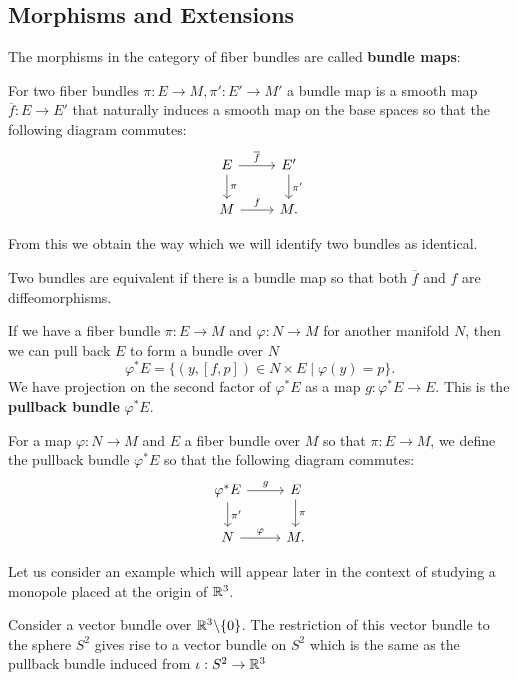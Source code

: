 		\subsection{Morphisms and Extensions}
		The morphisms in the category of fiber bundles are called \textbf{bundle maps}:
		
		\begin{defn}
			For two fiber bundles $\pi: E \rightarrow M, \pi': E' \rightarrow M'$ a bundle map is a smooth map $\overline f: E \rightarrow E'$ that naturally induces a smooth map on the base spaces so that the following diagram commutes:
			\[
			\begin{tikzcd}
			E \arrow{r}{\overline f} \arrow{d}{\pi} & E' \arrow{d}{\pi'} \\
			M \arrow{r}{f} & M.
			\end{tikzcd}
			\]
		\end{defn}
		From this we obtain the way which we will identify two bundles as identical.
		\begin{defn}
			Two bundles are equivalent if there is a bundle map so that both $\overline f$ and $f$ are diffeomorphisms. 
		\end{defn}
		If we have a fiber bundle $\pi: E \rightarrow M$ and $\varphi: N \rightarrow M$ for another manifold $N$, then we can pull back $E$ to form a bundle over $N$
		\begin{equation}
			\varphi^* E = \{(y,[f,p]) \in N \times E \mid \varphi(y) = p \}.
		\end{equation}
		We have projection on the second factor of $\varphi^* E$ as a map $g: \varphi^* E \rightarrow E$. 
		This is the \textbf{pullback bundle} $\varphi^* E$.
		\begin{defn}
			For a map $\varphi: N \rightarrow M$ and $E$ a fiber bundle over $M$ so that $\pi: E \rightarrow M$, we define the pullback bundle $\varphi^* E$ so that the following diagram commutes:
			\[
			\begin{tikzcd}
			\varphi^* E \arrow{r}{g} \arrow{d}{\pi'} & E \arrow{d}{\pi} \\
			N \arrow{r}{\varphi} & M.
			\end{tikzcd}
			\]
		\end{defn}
		Let us consider an example which will appear later in the context of studying a monopole placed at the origin of $\mathbb{R}^3$.
		\begin{eg}
			Consider a vector bundle over $\mathbb{R}^3 \backslash \{0\}$. The restriction of this vector bundle to the sphere $S^2$ gives rise to a vector bundle on $S^2$ which is the same as the pullback bundle induced from $\iota: S^2 \to \mathbb{R}^3$
		\end{eg}
		
